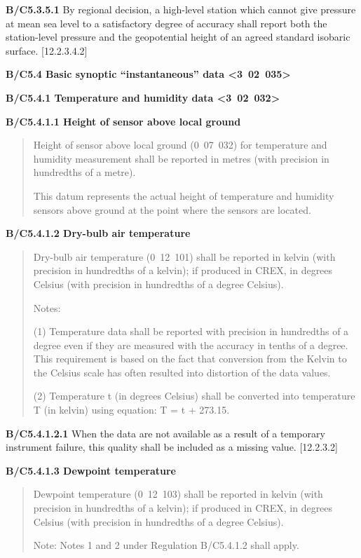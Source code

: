 \textbf{B/C5.3.5.1} By regional decision, a high-level station which cannot give pressure at mean sea level to a satisfactory degree of accuracy shall report both the station-level pressure and the geopotential height of an agreed standard isobaric surface. {[}12.2.3.4.2{]}

\textbf{B/C5.4 Basic synoptic ``instantaneous'' data \textless3~02~035\textgreater{}}

\textbf{B/C5.4.1 Temperature and humidity data \textless3~02~032\textgreater{}}

\textbf{B/C5.4.1.1 Height of sensor above local ground}

\begin{quote}
Height of sensor above local ground (0~07~032) for temperature and humidity measurement shall be reported in metres (with precision in hundredths of a metre).

This datum represents the actual height of temperature and humidity sensors above ground at the point where the sensors are located.
\end{quote}

\textbf{B/C5.4.1.2 Dry-bulb air temperature}

\begin{quote}
Dry-bulb air temperature (0~12~101) shall be reported in kelvin (with precision in hundredths of a kelvin); if produced in CREX, in degrees Celsius (with precision in hundredths of a degree Celsius).

Notes:

(1) Temperature data shall be reported with precision in hundredths of a degree even if they are measured with the accuracy in tenths of a degree. This requirement is based on the fact that conversion from the Kelvin to the Celsius scale has often resulted into distortion of the data values.

(2) Temperature t (in degrees Celsius) shall be converted into temperature T (in kelvin) using equation: T = t + 273.15.
\end{quote}

\textbf{B/C5.4.1.2.1} When the data are not available as a result of a temporary instrument failure, this quality shall be included as a missing value. {[}12.2.3.2{]}

\textbf{B/C5.4.1.3 Dewpoint temperature}

\begin{quote}
Dewpoint temperature (0~12~103) shall be reported in kelvin (with precision in hundredths of a kelvin); if produced in CREX, in degrees Celsius (with precision in hundredths of a degree Celsius).

Note: Notes 1 and 2 under Regulation B/C5.4.1.2 shall apply.
\end{quote}

